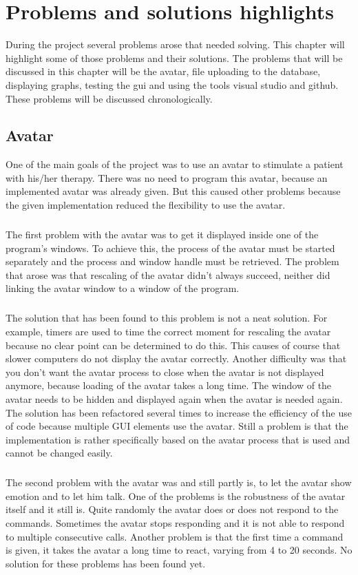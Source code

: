 \chapter{Problems and solutions highlights}
During the project several problems arose that needed solving. This chapter will highlight some of those problems and their solutions. The problems that will be discussed in this chapter will be the avatar, file uploading to the database, displaying graphs, testing the gui and using the tools visual studio and github. These problems will be discussed chronologically.
\section{Avatar}
One of the main goals of the project was to use an avatar to stimulate a patient with his/her therapy. There was no need to program this avatar, because an implemented avatar was already given. But this caused other problems because the given implementation reduced the flexibility to use the avatar. 
\paragraph{}
The first problem with the avatar was to get it displayed inside one of the program's windows. To achieve this, the process of the avatar must be started separately and the process and window handle must be retrieved. The problem that arose was that rescaling of the avatar didn't always succeed, neither did linking the avatar window to a window of the program. 
\paragraph{}
The solution that has been found to this problem is not a neat solution. For example, timers are used to time the correct moment for rescaling the avatar because no clear point can be determined to do this. This causes of course that slower computers do not display the avatar correctly.
Another difficulty was that you don't want the avatar process to close when the avatar is not displayed anymore, because loading of the avatar takes a long time. The window of the avatar needs to be hidden and displayed again when the avatar is needed again.
The solution has been refactored several times to increase the efficiency of the use of code because multiple GUI elements use the avatar. Still a problem is that the implementation is rather specifically based on the avatar process that is used and cannot be changed easily.
\paragraph{}
The second problem with the avatar was and still partly is, to let the avatar show emotion and to let him talk. One of the problems is the robustness of the avatar itself and it still is.  Quite randomly the avatar does or does not respond to the commands. Sometimes the avatar stops responding and it is not able to respond to multiple consecutive calls. Another problem is that the first time a command is given, it takes the avatar a long time to react, varying from 4 to 20 seconds. No solution for these problems has been found yet.
